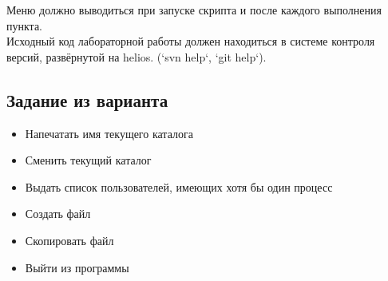 Меню должно выводиться при запуске скрипта и после каждого выполнения пункта.\\

Исходный код лабораторной работы должен находиться 
в системе контроля версий, развёрнутой на helios. (`svn help`, `git help`).\\

\subsection{Задание из варианта}
\begin{itemize}
    \item Напечатать имя текущего каталога
    \item Сменить текущий каталог
    \item Выдать список пользователей, имеющих хотя бы один процесс
    \item Создать файл
    \item Скопировать файл
    \item Выйти из программы
\end{itemize}
